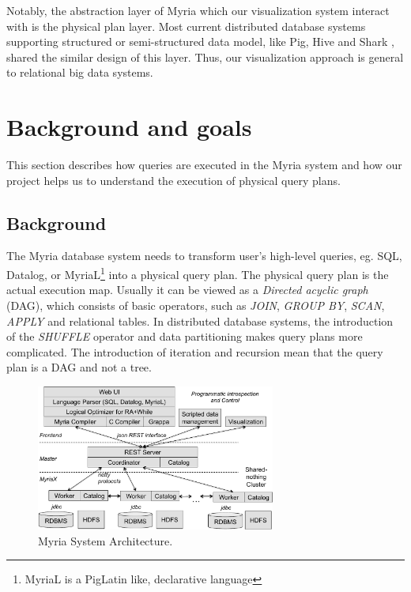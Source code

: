 \documentclass[11pt]{scrartcl}
\begin{document}
Notably, the abstraction layer of Myria which our visualization system interact with is the physical plan layer. Most current distributed database systems supporting structured or semi-structured data model, like Pig, Hive and Shark \cite{pig, hive, XinRZFSS13SIGMOD}, shared the similar design of this layer. Thus, our visualization approach is general to relational big data systems.


\section{Background and goals}

This section describes how queries are executed in the Myria system and how our project helps us to understand the execution of physical query plans.


\subsection{Background}
\label{sec:background}

The Myria database system needs to transform user's high-level queries, eg. SQL, Datalog, or MyriaL\footnote{MyriaL is a PigLatin like, declarative language} into a physical query plan. The physical query plan is the actual execution map. Usually it can be viewed as a \emph{Directed acyclic graph} (DAG), which consists of basic operators, such as \emph{JOIN}, \emph{GROUP BY}, \emph{SCAN}, \emph{APPLY} and relational tables. In distributed database systems, the introduction of the \emph{SHUFFLE} operator and data partitioning makes query plans more complicated. The introduction of iteration and recursion mean that the query plan is a DAG and not a tree.

\begin{figure}
 \begin{center}
     \includegraphics[width=0.7\textwidth]{arch}
   \end{center}
  \caption{Myria System Architecture.}
  \label{fig:myria_arc}
\end{figure}
\end{document}
